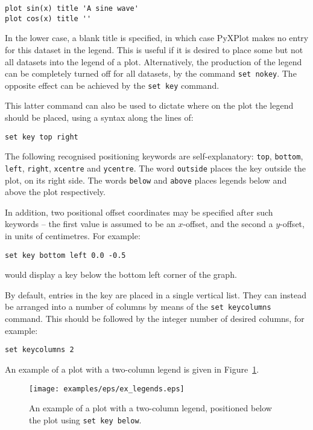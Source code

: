 \begin{verbatim}
plot sin(x) title 'A sine wave'
plot cos(x) title ''
\end{verbatim}

In the lower case, a blank title is specified, in which case PyXPlot makes no
entry for this dataset in the legend. This is useful if it is desired to place
some but not all datasets into the legend of a plot.  Alternatively, the
production of the legend can be completely turned off for all datasets, by the
command {\tt set nokey}. The opposite effect can be achieved by the
{\tt set key} command.

This latter command can also be used to dictate where on the plot the legend
should be placed, using a syntax along the lines of:

\begin{verbatim}
set key top right
\end{verbatim}

The following recognised positioning keywords are self-explanatory:
{\tt top}, {\tt bottom}, {\tt left}, {\tt right}, {\tt xcentre}
and {\tt ycentre}. The word {\tt outside} places the key outside the
plot, on its right side. The words {\tt below} and {\tt above} places
legends below and above the plot respectively.

In addition, two positional offset coordinates may be specified after such
keywords -- the first value is assumed to be an $x$-offset, and the second a
$y$-offset, in units of centimetres. For example:

\begin{verbatim}
set key bottom left 0.0 -0.5
\end{verbatim}

\noindent would display a key below the bottom left corner of the graph.

By default, entries in the key are placed in a single vertical list. They can
instead be arranged into a number of columns by means of the {\tt set
keycolumns} command. This should be followed by the integer number of desired columns, for
example:

\begin{verbatim}
set keycolumns 2
\end{verbatim}

\noindent An example of a plot with a two-column legend is given in
Figure~\ref{fig:ex_legends}.

\begin{figure}
\begin{center}
\texttt{[image: examples/eps/ex\_legends.eps]}
\end{center}
\caption{An example of a plot with a two-column legend, positioned below the plot using {\tt set key below}.}
\label{fig:ex_legends}
\end{figure}

